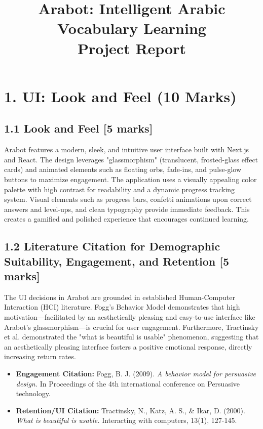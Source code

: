 \documentclass[12pt,a4paper]{article}
\title{\textbf{Arabot: Intelligent Arabic Vocabulary Learning}\\ \large Project Report}
\author{}
\date{}
\begin{document}
\maketitle

\section*{1. UI: Look and Feel (10 Marks)}
\subsection*{1.1 Look and Feel [5 marks]}
Arabot features a modern, sleek, and intuitive user interface built with Next.js and React. The design leverages "glassmorphism" (translucent, frosted-glass effect cards) and animated elements such as floating orbs, fade-ins, and pulse-glow buttons to maximize engagement. The application uses a visually appealing color palette with high contrast for readability and a dynamic progress tracking system. Visual elements such as progress bars, confetti animations upon correct answers and level-ups, and clean typography provide immediate feedback. This creates a gamified and polished experience that encourages continued learning.

\subsection*{1.2 Literature Citation for Demographic Suitability, Engagement, and Retention [5 marks]}
The UI decisions in Arabot are grounded in established Human-Computer Interaction (HCI) literature. Fogg’s Behavior Model demonstrates that high motivation—facilitated by an aesthetically pleasing and easy-to-use interface like Arabot's glassmorphism—is crucial for user engagement. Furthermore, Tractinsky et al. demonstrated the "what is beautiful is usable" phenomenon, suggesting that an aesthetically pleasing interface fosters a positive emotional response, directly increasing return rates.
\begin{itemize}[label={--}]
    \item \textbf{Engagement Citation:} Fogg, B. J. (2009). \textit{A behavior model for persuasive design.} In Proceedings of the 4th international conference on Persuasive technology.
    \item \textbf{Retention/UI Citation:} Tractinsky, N., Katz, A. S., \& Ikar, D. (2000). \textit{What is beautiful is usable.} Interacting with computers, 13(1), 127-145.
\end{itemize}
\end{document}
